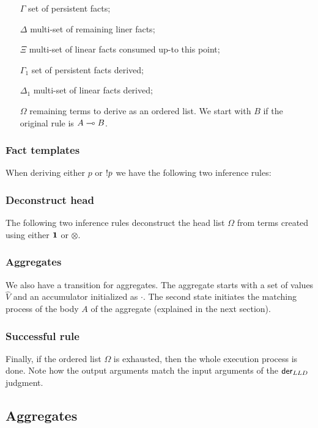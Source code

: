 \begin{enumerate}
   \item[$\Gamma$] set of persistent facts;

   \item[$\Delta$] multi-set of remaining liner facts;

   \item[$\Xi$] multi-set of linear facts consumed up-to this point;

   \item[$\Gamma_1$] set of persistent facts derived;

   \item[$\Delta_1$] multi-set of linear facts derived;

   \item[$\Omega$] remaining terms to derive as an ordered list. We start with
   $B$ if the original rule is $A \multimap B$.

\end{enumerate}

\subsubsection{Fact templates}

When deriving either $p$ or ${!} p$ we have the following two inference rules:



\subsubsection{Deconstruct head}

The following two inference rules deconstruct the head list $\Omega$ from terms
created using either $\mathbf{1}$ or $\otimes$.



\subsubsection{Aggregates}

We also have a transition for aggregates. The aggregate starts with a set of
values $\widehat{V}$ and an accumulator initialized as $\cdot$. The second state
initiates the matching process of the body $A$ of the aggregate (explained in
the next section).



\subsubsection{Successful rule}

Finally, if the ordered list $\Omega$ is exhausted, then the whole execution
process is done.  Note how the output arguments match the input arguments of the
$\mathsf{der}_{LLD} \;$judgment.



\subsection{Aggregates}



